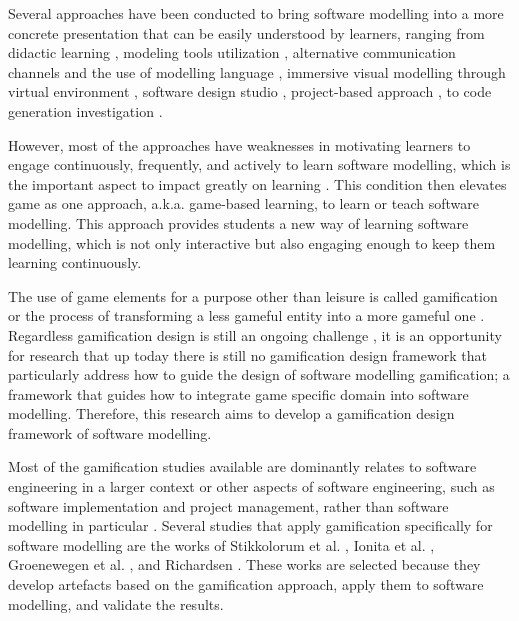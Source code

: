 \documentclass[runningheads,a4paper]{llncs}
\begin{document}
Several approaches have been conducted to bring software modelling into a more concrete presentation that can be easily understood by learners, ranging from didactic learning \cite{moisan2009teaching}, modeling tools utilization \cite{Akayama2013}, alternative communication channels and the use of modelling language \cite{Brandsteidl2011}, immersive visual modelling through virtual environment \cite{neubauer2003immersive}, software design studio \cite{Whittle2014}, project-based approach \cite{Szmurlo2007}, to code generation investigation \cite{schmidt2014teaching}.

However, most of the approaches have weaknesses in motivating learners to engage continuously, frequently, and actively to learn software modelling, which is the important aspect to impact greatly on learning \cite{Naps2005}. This condition then elevates game as one approach, a.k.a. game-based learning, to learn or teach software modelling. This approach provides students a new way of learning software modelling, which is not only interactive but also engaging enough to keep them learning continuously. 

The use of game elements for a purpose other than leisure is called gamification \cite{deterding2011game} or  the process of transforming a less gameful entity into a more gameful one \cite{Werbach2014} \cite{Kapp2012} \cite{Yohannis2014}. Regardless gamification design is still an ongoing challenge \cite{Deterding2013}, it is an opportunity for research that up today there is still no gamification design framework that particularly address how to guide the design of software modelling gamification; a framework that guides how to integrate game specific domain into software modelling. Therefore, this research aims to develop a gamification design framework of software modelling.

Most of the gamification studies available are dominantly relates to software engineering in a larger context or other aspects of software engineering, such as software implementation and project management, rather than software modelling in particular \cite{Pedreira2015}. Several studies that apply gamification specifically for software modelling are the works of Stikkolorum et al. \cite{Stikkolorum2014}, Ionita et al. \cite{Ionita2015}, Groenewegen et al. \cite{Groenewegen2010}, and Richardsen \cite{Richardsen2014}. These works are selected because they develop artefacts based on the gamification approach, apply them to software modelling, and validate the results. 
\end{document}
